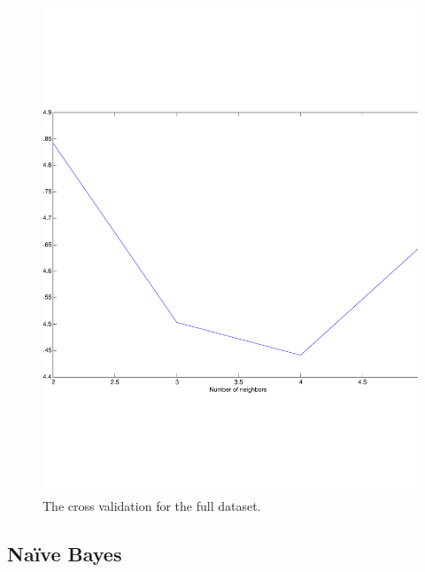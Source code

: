 \begin{figure}[H]
\centering
\includegraphics[width=\linewidth]{code/5fold_knn_60000samples}
\caption{The cross validation for the full dataset.\label{fig:knn_large}}
\end{figure}



\subsection{Naïve Bayes}



